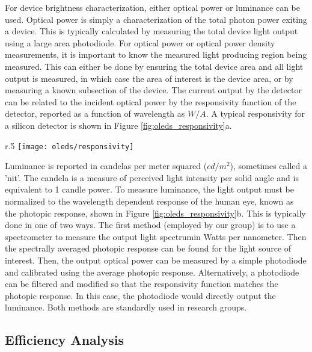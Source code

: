 \documentclass[../thesis.tex]{subfiles}
\begin{document}
For device brightness characterization, either optical power or luminance can be used.
Optical power is simply a characterization of the total photon power exiting a device.
This is typically calculated by measuring the total device light output using a large area photodiode.
For optical power or optical power density measurements, it is important to know the measured light producing region being measured.
This can either be done by ensuring the total device area and all light output is measured, in which case the area of interest is the device area, or by measuring a known subsection of the device.
The current output by the detector can be related to the incident optical power by the responsivity function of the detector, reported as a function of wavelength as $W/A$.
A typical responsivity for a silicon detector is shown in Figure \ref{fig:oleds_responsivity}a.

\begin{wrapfigure}{r}{.5\textwidth}
    \centering
    \texttt{[image: oleds/responsivity]}
\caption{a. Silicon detector responsivity b. Photopic response}
\label{fig:oleds_responsivity}
\end{wrapfigure}


Luminance is reported in candelas per meter squared ($cd/m^2$), sometimes called a 'nit'.
The candela is a measure of perceived light intensity per solid angle and is equivalent to 1 candle power.
To measure luminance, the light output must be normalized to the wavelength dependent response of the human eye, known as the photopic response, shown in Figure \ref{fig:oleds_responsivity}b.
This is typically done in one of two ways.
The first method (employed by our group) is to use a spectrometer to measure the output light spectrumin Watts per nanometer.  
Then the spectrally averaged photopic response can be found for the light source of interest.
Then, the output optical power can be measured by a simple photodiode and calibrated using the average photopic response.
Alternatively, a photodiode can be filtered and modified so that the responsivity function matches the photopic response.
In this case, the photodiode would directly output the luminance.
Both methods are standardly used in research groups.\supercite{Hershey2016,Inoue2016,Forrest2003}


\subsection{Efficiency Analysis}\label{sec:efficiency_analysis}
\end{document}
